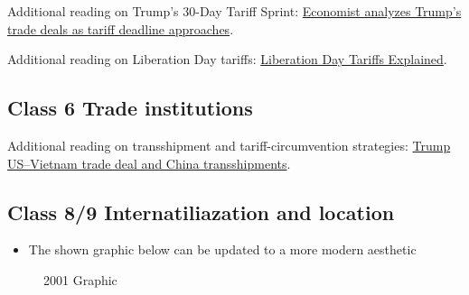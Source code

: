 \documentclass[
  11pt,
]{article}
\providecommand{\tightlist}{%
  \setlength{\itemsep}{0pt}\setlength{\parskip}{0pt}}
\begin{document}
Additional reading on Trump's 30-Day Tariff Sprint:
\href{https://www.pbs.org/newshour/show/economist-analyzes-trumps-trade-deals-as-tariff-deadline-approaches}{Economist
analyzes Trump's trade deals as tariff deadline approaches}.

Additional reading on Liberation Day tariffs:
\href{https://www.csis.org/analysis/liberation-day-tariffs-explained\#:~:text=In\%20a\%20Rose\%20Garden\%20event,place\%20a\%20universal\%2010\%20percent}{Liberation
Day Tariffs Explained}.

\subsection{Class 6 Trade
institutions}\label{class-6-trade-institutions}

Additional reading on transshipment and tariff-circumvention strategies:
\href{https://time.com/7300087/trump-us-vietnam-trade-deal-china-transshipments/}{Trump
US--Vietnam trade deal and China transshipments}.

\subsection{Class 8/9 Internatiliazation and
location}\label{class-89-internatiliazation-and-location}

\begin{itemize}
\tightlist
\item
  The shown graphic below can be updated to a more modern aesthetic
\end{itemize}

\begin{figure}


\caption{\label{fig-1}2001 Graphic}

\end{figure}%
\end{document}
